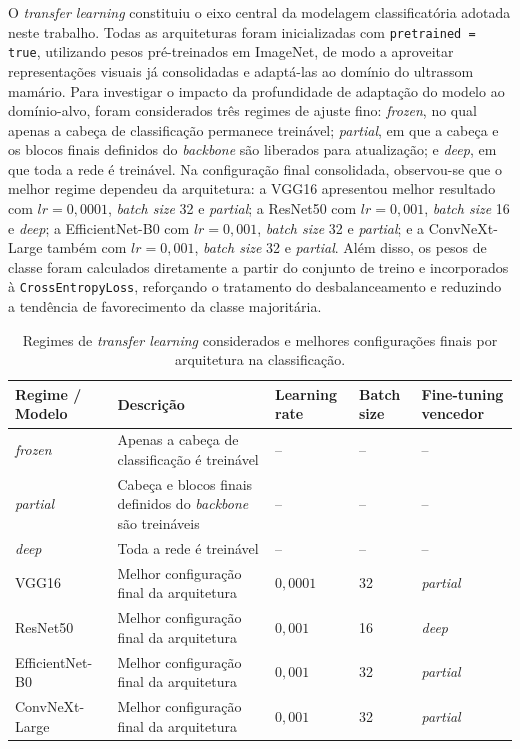 \documentclass[tcc,capa]{texufpel}
\begin{document}
O \textit{transfer learning} constituiu o eixo central da modelagem classificatória adotada neste trabalho. Todas as arquiteturas foram inicializadas com \texttt{pretrained = true}, utilizando pesos pré-treinados em ImageNet, de modo a aproveitar representações visuais já consolidadas e adaptá-las ao domínio do ultrassom mamário. Para investigar o impacto da profundidade de adaptação do modelo ao domínio-alvo, foram considerados três regimes de ajuste fino: \textit{frozen}, no qual apenas a cabeça de classificação permanece treinável; \textit{partial}, em que a cabeça e os blocos finais definidos do \textit{backbone} são liberados para atualização; e \textit{deep}, em que toda a rede é treinável. Na configuração final consolidada, observou-se que o melhor regime dependeu da arquitetura: a VGG16 apresentou melhor resultado com \(lr = 0{,}0001\), \textit{batch size} 32 e \textit{partial}; a ResNet50 com \(lr = 0{,}001\), \textit{batch size} 16 e \textit{deep}; a EfficientNet-B0 com \(lr = 0{,}001\), \textit{batch size} 32 e \textit{partial}; e a ConvNeXt-Large também com \(lr = 0{,}001\), \textit{batch size} 32 e \textit{partial}. Além disso, os pesos de classe foram calculados diretamente a partir do conjunto de treino e incorporados à \texttt{CrossEntropyLoss}, reforçando o tratamento do desbalanceamento e reduzindo a tendência de favorecimento da classe majoritária.

\begin{table}[htbp]
	\centering
	\caption{Regimes de \textit{transfer learning} considerados e melhores configurações finais por arquitetura na classificação.}
	\label{tab:transfer_learning_classification}
	\begin{tabular}{p{3.3cm} p{3.9cm} p{2.0cm} p{2.0cm} p{2.2cm}}
		\hline
		\textbf{Regime / Modelo} & \textbf{Descrição} & \textbf{Learning rate} & \textbf{Batch size} & \textbf{Fine-tuning vencedor} \\[0.2cm]
		\hline
		\textit{frozen} & Apenas a cabeça de classificação é treinável & -- & -- & -- \\
		\textit{partial} & Cabeça e blocos finais definidos do \textit{backbone} são treináveis & -- & -- & -- \\
		\textit{deep} & Toda a rede é treinável & -- & -- & -- \\
		\hline
		VGG16 & Melhor configuração final da arquitetura & \(0{,}0001\) & 32 & \textit{partial} \\
		ResNet50 & Melhor configuração final da arquitetura & \(0{,}001\) & 16 & \textit{deep} \\
		EfficientNet-B0 & Melhor configuração final da arquitetura & \(0{,}001\) & 32 & \textit{partial} \\
		ConvNeXt-Large & Melhor configuração final da arquitetura & \(0{,}001\) & 32 & \textit{partial} \\
		\hline
	\end{tabular}
\end{table}
\end{document}
